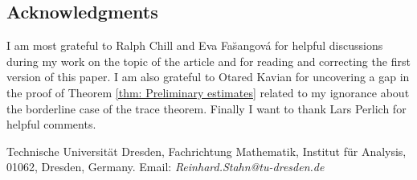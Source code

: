 \documentclass{amsart}
\begin{document}

\subsection*{Acknowledgments} I am most grateful to Ralph Chill and Eva Fa\u{s}angov\'a for helpful discussions during my work on the topic of the article and for reading and correcting the first version of this paper. I am also grateful to Otared Kavian for uncovering a gap in the proof of Theorem \ref{thm: Preliminary estimates} related to my ignorance about the borderline case of the trace theorem. Finally I want to thank Lars Perlich for helpful comments.





\hfill

Technische Universit\"{a}t Dresden, Fachrichtung Mathematik, Institut f\"{u}r Analysis, 01062, Dresden, Germany. Email: \textit{Reinhard.Stahn@tu-dresden.de}
\end{document}
